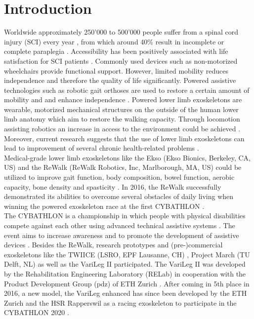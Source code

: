 \documentclass[conference,a4paper]{IEEEtran}
\begin{document}
\section{Introduction}
Worldwide approximately 250’000 to 500’000 people suffer from a spinal cord injury (SCI) every year \cite{WHOSCI}, from which around 40\% result in incomplete or complete paraplegia \cite{National2016}. Accessibility has been positively associated with life satisfaction for SCI patients \cite{Richards1999access}. Commonly used devices such as non-motorized wheelchairs provide functional support. However, limited mobility reduces independence and therefore the quality of life significantly. Powered assistive technologies such as robotic gait orthoses are used to restore a certain amount of mobility and and enhance independence \cite{samuelsson2008user}.
Powered lower limb exoskeletons are wearable, motorized mechanical structures on the outside of the human lower limb anatomy which aim to restore the walking capacity. Through locomotion assisting robotics an increase in access to the environment could be achieved \cite{collinger2013functional}.
Moreover, current research suggests that the use of lower limb exoskeletons can lead to improvement of several chronic health-related problems \cite{sciencedirect}. \\


Medical-grade lower limb exoskeletons like the Ekso (Ekso Bionics, Berkeley, CA, US) \cite{eksobionics} and the ReWalk (ReWalk Robotics, Inc, Marlborough, MA, US) \cite{rewalk} could be utilized to improve gait function, body composition, bowel function, aerobic capacity, bone density and spasticity \cite{sciencedirect}. In 2016, the ReWalk successfully demonstrated its abilities to overcome several obstacles of daily living when winning the powered exoskeleton race at the first CYBATHLON \cite{cybathlonwebpage}. \\
The CYBATHLON is a championship in which people with physical disabilities compete against each other using advanced technical assistive systems \cite{cybathlonwebpage} \cite{riener2016cybathlon}. The event aims to increase awareness and to promote the development of assistive devices \cite{ienca2017cybathlon}. Besides the ReWalk, research prototypes and (pre-)commercial exoskeletons like the TWIICE (LSRO, EPF Lausanne, CH) \cite{vouga2017twiice} \cite{twiice}, Project March (TU Delft, NL) \cite{projectmarch} as well as  the VariLeg II participated. The VariLeg II was developed by the Rehabilitation Engineering Laboratory (RELab) in cooperation with the Product Development Group (pdz) of ETH Zurich \cite{schrade}. After coming in 5th place in 2016, a new model, the VariLeg enhanced has since been developed by the ETH Zurich and the HSR Rapperswil as a racing exoskeleton to participate in the CYBATHLON 2020 \cite{varilegenhanced}. 
\end{document}

